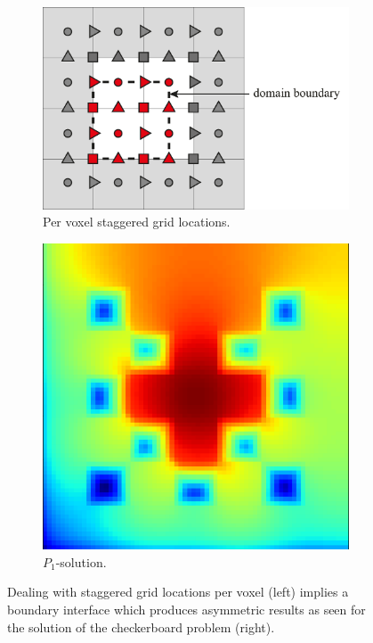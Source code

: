 \begin{figure}[h]
\begin{subfigure}[t]{0.48\columnwidth}
\hspace{0.5in}
\includegraphics[width=1\textwidth]{04_pn_method/figures/fig_staggered_grid_domain_boundary_wrong.pdf}
\caption{Per voxel staggered grid locations.}
\label{fig:pn_staggering_asymmetry_bc}
\end{subfigure}
\hspace{0.01\columnwidth}
\begin{subfigure}[t]{0.48\columnwidth}
\centering
\includegraphics[width=0.66\columnwidth]{04_pn_method/results/p1_staggered_grid_asymmetric_bc.png}
\caption{$P_1$-solution.}
\label{fig:pn_staggering_asymmetry_bc_checkerboard}
\end{subfigure}
\caption{Dealing with staggered grid locations per voxel (left) implies a boundary interface which produces asymmetric results as seen for the solution of the checkerboard problem (right).}
\label{fig:pn_staggered_grid_unhandled_bc}
\end{figure}

